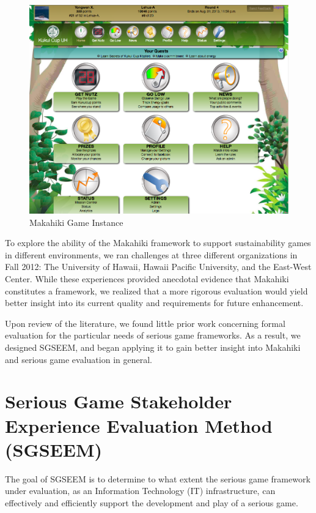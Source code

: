 \documentclass{sigchi}
\begin{document}
\begin{figure}[ht!]
  \center
  \includegraphics[width=\columnwidth]{kukuicup-home}
  \caption{Makahiki Game Instance}
  \label{fig:Makahiki-Home-Page}
\end{figure}

To explore the ability of the Makahiki framework to support sustainability games in
different environments, we ran challenges at three different organizations in Fall 2012:
The University of Hawaii, Hawaii Pacific University, and the East-West Center. While these
experiences provided anecdotal evidence that Makahiki constitutes a framework, we realized
that a more rigorous evaluation would yield better insight into its current quality and
requirements for future enhancement.

Upon review of the literature, we found little prior work concerning formal evaluation for
the particular needs of serious game frameworks. As a result, we designed SGSEEM, and
began applying it to gain better insight into Makahiki and serious game evaluation in general.

\section{Serious Game Stakeholder Experience Evaluation Method (SGSEEM)}

The goal of SGSEEM is to determine to what extent the serious game
framework under evaluation, as an Information Technology (IT)
infrastructure, can effectively and efficiently support the
development and play of a serious game.
\end{document}
